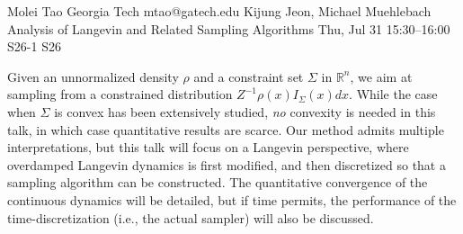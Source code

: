 \begin{talk}
  {Molei Tao}%
  {Georgia Tech}%
  {mtao@gatech.edu}%
  {Kijung Jeon, Michael Muehlebach}%
  {Analysis of Langevin and Related Sampling Algorithms}%
  {}%
  {Thu, Jul 31 15:30--16:00}%
  {S26-1}%
  {S26}%
    

Given an unnormalized density $\rho$ and a constraint set $\Sigma$ in $\mathbb{R}^n$, we aim at sampling from a constrained distribution $Z^{-1} \rho(x) I_{\Sigma}(x) dx$. While the case when $\Sigma$ is convex has been extensively studied, \emph{no} convexity is needed in this talk, in which case quantitative results are scarce. %
Our method admits multiple interpretations, but this talk will focus on a Langevin perspective, where overdamped Langevin dynamics is first modified, and then discretized so that a sampling algorithm can be constructed. The quantitative convergence of the continuous dynamics will be detailed, but if time permits, the performance of the time-discretization (i.e., the actual sampler) will also be discussed.





\end{talk}
